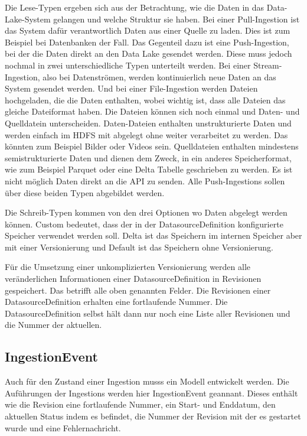 Die Lese-Typen ergeben sich aus der Betrachtung, wie die Daten in das Data-Lake-System gelangen und welche Struktur sie haben.
Bei einer Pull-Ingestion ist das System dafür verantwortlich Daten aus einer Quelle zu laden.
Dies ist zum Beispiel bei Datenbanken der Fall.
Das Gegenteil dazu ist eine Push-Ingestion, bei der die Daten direkt an den Data Lake gesendet werden.
Diese muss jedoch nochmal in zwei unterschiedliche Typen unterteilt werden.
Bei einer Stream-Ingestion, also bei Datenströmen, werden kontinuierlich neue Daten an das System gesendet werden.
Und bei einer File-Ingestion werden Dateien hochgeladen, die die Daten enthalten, wobei wichtig ist, dass alle Dateien das gleiche Dateiformat haben.
Die Dateien können sich noch einmal und Daten- und Quelldatein unterscheiden.
Daten-Dateien enthalten unstrukturierte Daten und werden einfach im HDFS mit abgelegt ohne weiter verarbeitet zu werden.
Das könnten zum Beispiel Bilder oder Videos sein.
Quelldateien enthalten mindestens semistrukturierte Daten und dienen dem Zweck, in ein anderes Speicherformat, wie zum Beispiel Parquet oder eine Delta Tabelle geschrieben zu werden.
Es ist nicht möglich Daten direkt an die API zu senden.
Alle Push-Ingestions sollen über diese beiden Typen abgebildet werden.

Die Schreib-Typen kommen von den drei Optionen wo Daten abgelegt werden können.
Custom bedeutet, dass der in der DatasourceDefinition konfigurierte Speicher verwendet werden soll.
Delta ist das Speichern im internen Speicher aber mit einer Versionierung und Default ist das Speichern ohne Versionierung.

Für die Umsetzung einer unkomplizierten Versionierung werden alle veränderlichen Informationen einer DatasourceDefinition in Revisionen gespeichert.
Das betrifft alle oben genannten Felder.
Die Revisionen einer DatasourceDefinition erhalten eine fortlaufende Nummer.
Die DatasourceDefinition selbst hält dann nur noch eine Liste aller Revisionen und die Nummer der aktuellen.

\subsection{IngestionEvent}

Auch für den Zustand einer Ingestion musss ein Modell entwickelt werden.
Die Auführungen der Ingestions werden hier IngestionEvent geannant.
Dieses enthält wie die Revision eine fortlaufende Nummer, ein Start- und Enddatum, den aktuellen Status indem es befindet, die Nummer der Revision mit der es gestartet wurde und eine Fehlernachricht.

